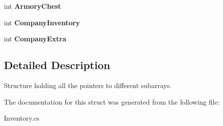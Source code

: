\begin{DoxyCompactItemize}
\item 
\hypertarget{structffxivlib_1_1_inventory_1_1_i_n_v_e_n_t_o_r_y_a86d52897345d69ab1afee0012b70d2ea}{int {\bfseries Armory\-Chest}}\label{structffxivlib_1_1_inventory_1_1_i_n_v_e_n_t_o_r_y_a86d52897345d69ab1afee0012b70d2ea}

\item 
\hypertarget{structffxivlib_1_1_inventory_1_1_i_n_v_e_n_t_o_r_y_a54297a026b3910adf86f38925f9cce95}{int {\bfseries Company\-Inventory}}\label{structffxivlib_1_1_inventory_1_1_i_n_v_e_n_t_o_r_y_a54297a026b3910adf86f38925f9cce95}

\item 
\hypertarget{structffxivlib_1_1_inventory_1_1_i_n_v_e_n_t_o_r_y_a9b4585475cbee2a3ddf935260ffd959e}{int {\bfseries Company\-Extra}}\label{structffxivlib_1_1_inventory_1_1_i_n_v_e_n_t_o_r_y_a9b4585475cbee2a3ddf935260ffd959e}

\end{DoxyCompactItemize}


\subsection{Detailed Description}
Structure holding all the pointers to different subarrays. 



The documentation for this struct was generated from the following file\-:\begin{DoxyCompactItemize}
\item 
Inventory.\-cs\end{DoxyCompactItemize}
